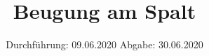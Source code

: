 

\subject{V406}
\title{Beugung am Spalt}
\date{%
  Durchführung: 09.06.2020
  \hspace{3em}
  Abgabe: 30.06.2020
}



\maketitle
\thispagestyle{empty}
\tableofcontents
\newpage







\printbibliography{}


